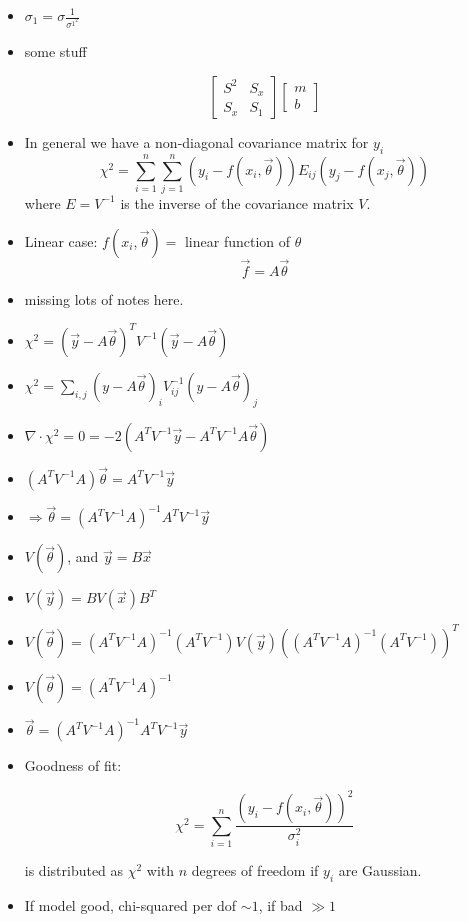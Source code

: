 \begin{itemize}
    \item $\sigma_1 = \sigma \frac{1}{\sigma^{1^2}}$

    \item some stuff

          \[ \begin{bmatrix}
                  S^2 & S_{x} \\
                  S_x & S_1
              \end{bmatrix}
              \begin{bmatrix}
                  m \\
                  b
              \end{bmatrix} \]

    \item In general we have a non-diagonal covariance matrix for $y_i$
          \[ \chi^2 = \sum_{i=1}^{n} \sum_{j=1}^{n} (y_i - f(x_i, \vec{\theta})) E_{ij} (y_j - f(x_j, \vec{\theta})) \]
          where $E = V^{-1}$ is the inverse of the covariance matrix $V$.

    \item Linear case: $f(x_i, \vec{\theta}) = $ linear function of $\theta$
          \[ \boxed{\vec{f}} = A \vec{\theta} \]

    \item missing lots of notes here.

    \item $ \chi^2 = (\vec{y} - A \vec{\theta})^T V^{-1} (\vec{y} - A \vec{\theta})$
    \item $ \chi^2 = \sum_{i,j} (y-A \vec{\theta})_i V_{ij}^{-1} (y - A \vec{\theta})_j$
    \item $\nabla \cdot \chi^2 = 0 = -2 (A^T V^{-1}\vec{y} - A^T V^{-1} A \vec{\theta})$
    \item $(A^T V^{-1} A) \vec{\theta} = A^T V^{-1} \vec{y}$
    \item $\Rightarrow \vec{\theta} = (A^T V^{-1} A)^{-1} A^T V^{-1} \vec{y}$
    \item $V(\vec{\theta})$, and $\vec{y} = B \vec{x}$
    \item $V(\vec{y}) = B V(\vec{x}) B^T$
    \item $V(\vec{\theta}) = (A^T V^{-1} A)^{-1} (A^T V^{-1} ) V(\vec{y}) ( (A^T V^{-1} A)^{-1} (A^T V^{-1}))^T$
    \item $\boxed{V(\vec{\theta}) = (A^T V^{-1} A)^{-1}}$
    \item $ \boxed{\vec{\theta} = (A^T V^{-1} A)^{-1} A^T V^{-1} \vec{y}}$
    \item Goodness of fit:

          \[ \boxed{ \chi^2 = \sum_{i=1}^{n} \frac{(y_i - f(x_i, \vec{\theta}))^2}{\sigma_i^2} } \]

          is distributed as $\chi^2$ with $n$ degrees of freedom if $y_i$ are Gaussian.

    \item If model good, chi-squared per dof $\sim 1$, if bad $\gg 1$
\end{itemize}